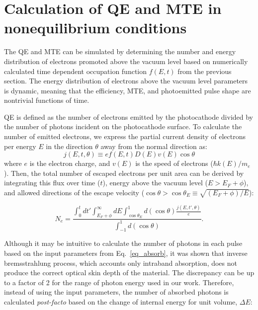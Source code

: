 \section{Calculation of QE and MTE in nonequilibrium conditions} 

The QE and MTE can be simulated by determining the number and energy distribution of electrons promoted above the vacuum level based on numerically calculated time dependent occupation function $f(E,t)$ from the previous section. The energy distribution of electrons above the vacuum level parameters is dynamic, meaning that the efficiency, MTE, and photoemitted pulse shape are nontrivial functions of time.

QE is defined as the number of electrons emitted by the photocathode divided by the number of photons incident on the photocathode surface. To calculate the number of emitted electrons, we express the partial current density of electrons per energy $E$ in the direction $\theta$ away from the normal direction as:
\begin{equation}
	j(E,t,\theta) \equiv e f(E,t) D(E) v(E) \cos\theta 
\end{equation}
where $e$ is the electron charge, and $v(E)$ is the speed of electrons ($\hbar k(E) / m_e$).
Then,  the total number of escaped electrons per unit area can be derived by integrating  this flux over time ($t$), energy above the vacuum level ($E > E_F + \phi$), and allowed directions of the escape velocity ($\cos \theta > \cos\theta_E \equiv \sqrt{(E_F + \phi)/E}$):\cite{dowell2009_QuantumEfficiencyThermal}

	\begin{equation}\label{eq_Ne}
		N_e = \frac{\displaystyle \int_0^t dt' \int_{E_F+\phi}^\infty dE \int^1_{\cos\theta_E} d(\cos\theta) \frac{j(E,t',\theta)}{e}}{\displaystyle \int^1_{-1}d(\cos\theta)}.
	\end{equation}


Although it may be intuitive to calculate the number of photons in each pulse based on the input parameters from Eq.~\ref{eq_absorb}, it was shown that inverse bremsstrahlung process, which accounts only intraband absorption, does not produce the correct optical skin depth of the material.\cite{skin} The discrepancy can be up to a factor of 2 for the range of photon energy used in our work. Therefore, instead of using the input parameters, the number of absorbed photons is calculated \emph{post-facto} based on the change of internal energy for unit volume, $\Delta E$:

